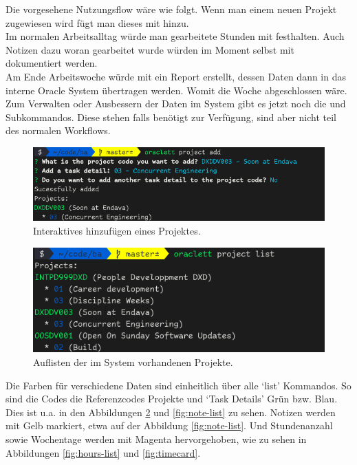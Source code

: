 \documentclass[oneside,bibliography=totocnumbered,BCOR=5mm]{scrbook}
\begin{document}
Die vorgesehene Nutzungsflow wäre wie folgt. Wenn man einem neuen Projekt
zugewiesen wird fügt man dieses  mit  hinzu.
\\
Im normalen Arbeitsalltag würde man gearbeitete Stunden mit  festhalten. Auch Notizen dazu woran gearbeitet wurde würden im Moment
selbst mit  dokumentiert werden.
\\
Am Ende Arbeitswoche würde mit  ein Report erstellt, dessen
Daten dann in das interne Oracle System übertragen werden. Womit die Woche
abgeschlossen wäre.
\\
Zum Verwalten oder Ausbessern der Daten im System gibt es jetzt noch die
 und  Subkommandos. Diese stehen falls
benötigt zur Verfügung, sind aber nicht teil des normalen Workflows.

\begin{figure}[H]
  \centering
  \includegraphics[scale=0.5]{project-add.png}
  \caption{Interaktives hinzufügen eines Projektes.}
  \label{fig:project-add}
\end{figure}

\begin{figure}[H]
  \centering
  \includegraphics[scale=0.5]{project-list.png}
  \caption{Auflisten der im System vorhandenen Projekte.}
  \label{fig:project-list}
\end{figure}

Die Farben für verschiedene Daten sind einheitlich über alle `list' Kommandos.
So sind die Codes die Referenzcodes Projekte und `Task Details' Grün
bzw. Blau. Dies ist u.a. in den Abbildungen \ref{fig:project-list} und
\ref{fig:note-list} zu sehen. Notizen werden mit Gelb markiert, etwa auf der
Abbildung \ref{fig:note-list}. Und Stundenanzahl sowie Wochentage werden mit
Magenta hervorgehoben, wie zu sehen in Abbildungen \ref{fig:hours-list} und
\ref{fig:timecard}.
\end{document}
